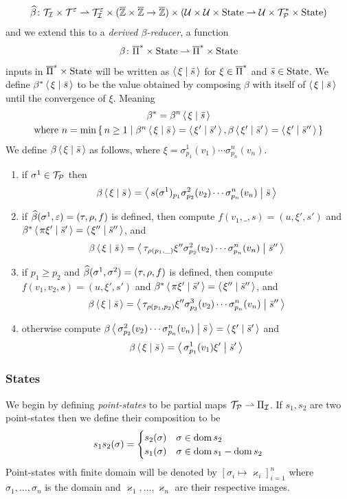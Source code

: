 \documentclass{llncs}
\begin{document}
\[ \widehat\beta\colon\mathcal T_{\mathcal I}\times\mathcal T^\varepsilon \rightharpoonup \mathcal T_{\mathcal I}^\varepsilon\times(\overline{\mathbb Z}\times\overline{\mathbb Z}\to\overline{\mathbb Z})\times(\mathcal U\times\mathcal U\times\mathrm{State}\rightharpoonup\mathcal U\times\mathcal T_{\mathcal P}^*\times\mathrm{State}) \]
and we extend this to a \textit{derived $\beta$-reducer}, a function
\[ \beta\colon\overline{\Pi}^*\times\mathrm{State} \rightharpoonup \overline{\Pi}^*\times\mathrm{State} \]
inputs in $\overline{\Pi}^*\times\mathrm{State}$ will be written as $\gen\xi[\bar s]$ for $\xi\in\overline{\Pi}^*$ and $\bar s\in\mathrm{State}$.
We define $\beta^*\gen\xi[\bar s]$ to be the value obtained by composing $\beta$ with itself of $\gen\xi[\bar s]$ until the convergence of $\xi$.
Meaning
\begin{multline*}
    \beta^* = \beta^n\gen\xi[\bar s]\\
    \hbox{where $n=\min\set{n\geq1}[{\beta^n\gen\xi[\bar s]=\gen{\xi'}[\bar s'],\beta\gen{\xi'}[\bar s']=\gen{\xi'}[\bar s'']}]$}
\end{multline*}
We define $\beta\gen\xi[\bar s]$ as follows, where $\xi=\sigma^1_{p_1}(v_1)\cdots\sigma^n_{p_n}(v_n)$.
\begin{enumerate}
    \item if $\sigma^1\in\mathcal T_{\mathcal P}$ then
    \[ \beta\gen\xi[\bar s] = \gen{s(\sigma^1)_{p_1}\sigma^2_{p_2}(v_2)\cdots\sigma^n_{p_n}(v_n)}[\bar s] \]
    \item if $\widehat\beta(\sigma^1,\varepsilon)=(\tau,\rho,f)$ is defined, then compute $f(v_1,\_,s)=(u,\xi',s')$ and $\beta^*\gen{\pi\xi'}[\bar s']=\gen{\xi''}[\bar s'']$, and
    \[ \beta\gen\xi[\bar s] = \gen{\tau_{\rho(p_1,\_)}\xi''\sigma^2_{p_2}(v_2)\cdots\sigma^n_{p_n}(v_n)}[\bar s''] \]
    \item if $p_1\geq p_2$ and $\widehat\beta(\sigma^1,\sigma^2)=(\tau,\rho,f)$ is defined, then compute $f(v_1,v_2,s)=(u,\xi',s')$ and $\beta^*\gen{\pi\xi'}[\bar s']=\gen{\xi''}[\bar s'']$, and
    \[ \beta\gen\xi[\bar s] = \gen{\tau_{\rho(p_1,p_2)}\xi''\sigma^3_{p_3}(v_2)\cdots\sigma^n_{p_n}(v_n)}[\bar s''] \]
    \item otherwise compute $\beta\gen{\sigma^2_{p_2}(v_2)\cdots\sigma^n_{p_n}(v_n)}[\bar s]=\gen{\xi'}[\bar s']$ and
    \[ \beta\gen\xi[\bar s] = \gen{\sigma^1_{p_1}(v_1)\xi'}[\bar s'] \]
\end{enumerate}

\subsubsection{States}

We begin by defining \textit{point-states} to be partial maps $\mathcal T_{\mathcal P}\rightharpoonup\Pi_{\mathcal I}$.
If $s_1,s_2$ are two point-states then we define their composition to be
\[ s_1s_2(\sigma) = \begin{cases} s_2(\sigma) & \sigma\in\operatorname{dom} s_2\\ s_1(\sigma) & \sigma\in\operatorname{dom} s_1-\operatorname{dom} s_2\end{cases} \]
Point-states with finite domain will be denoted by $[\sigma_i\mapsto\varkappa_i]_{i=1}^n$ where $\sigma_1,\dots,\sigma_n$ is the domain and $\varkappa_1,\dots,\varkappa_n$ are their respective images.
\end{document}
